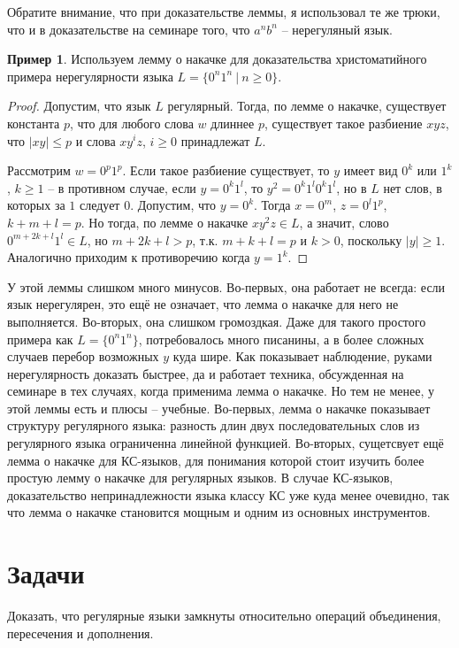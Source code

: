 \documentclass[12pt]{article}
\theoremstyle{definiton}
\theoremstyle{definition}
\newtheorem{Example}{Пример}
\theoremstyle{definition}
\let\leq\leqslant
\let\geq\geqslant
\newcounter{problem}
\newcounter{subproblem}
\def\prp{\medskip\noindent\stepcounter{problem}{\bf Задача \theproblem .  }\setcounter{subproblem}{0} }
\begin{document}
	Обратите внимание, что при доказательстве леммы, я использовал те же трюки, что и в доказательстве на семинаре того, что $a^nb^n$ -- нерегуляный язык.

	\begin{Example}
		Используем лемму о накачке для доказательства христоматийного примера нерегулярности языка $L = \{0^n1^n\ |\ n \geq 0\}$. 	
	\end{Example}
	\begin{proof}
		Допустим, что язык $L$ регулярный. Тогда, по лемме о накачке, существует константа $p$, что для любого слова  $w$ длиннее $p$, существует такое разбиение $xyz$, что $|xy| \leq p$ и слова $xy^iz$, $ i \geq 0$ принадлежат $L$.

		Рассмотрим $w = 0^p1^p$. Если такое разбиение существует, то $y$ имеет вид $0^k$ или $1^k$, $k \geq 1$ -- в противном случае, если $y = 0^k1^l$, то  $y^2 = 0^k1^l0^k1^l$, но в $L$ нет слов, в которых за $1$ следует $0$.
	Допустим, что $y = 0^k$. Тогда $x = 0^m$, $z = 0^l1^p$, $k+m+l = p$. Но тогда, по лемме о накачке $xy^2z \in L$, а значит, слово $0^{m+2k+l}1^l \in L$, но $m+2k+l > p$, т.к. $m+k+l = p$ и $k > 0$, поскольку $|y| \geq 1$. Аналогично приходим к противоречию когда $y = 1^k$.
	\end{proof}

		У этой леммы слишком много минусов. Во-первых, она работает не всегда: если язык нерегулярен, это ещё не означает, что лемма о накачке для него не выполняется. Во-вторых, она слишком громоздкая. Даже для такого простого примера как $L  = \{0^n1^n\}$, потребовалось много писанины, а в более сложных случаев перебор возможных $y$ куда шире. Как показывает наблюдение, руками нерегулярность доказать быстрее, да и работает техника, обсужденная на семинаре в тех случаях, когда применима лемма о накачке. Но тем не менее, у этой леммы есть и плюсы -- учебные. Во-первых, лемма о накачке показывает структуру регулярного языка: разность длин двух последовательных слов из регулярного языка ограниченна линейной функцией. Во-вторых, сущетсвует ещё лемма о накачке для КС-языков, для понимания которой стоит изучить более простую лемму о накачке для регулярных языков. В случае КС-языков, доказательство непринадлежности языка классу КС уже куда менее очевидно, так что лемма о накачке становится мощным и одним из основных инструментов.
		
		\section{Задачи}
		\prp Доказать, что регулярные языки замкнуты относительно операций объединения, пересечения и дополнения.
		\medskip
		
\end{document}
